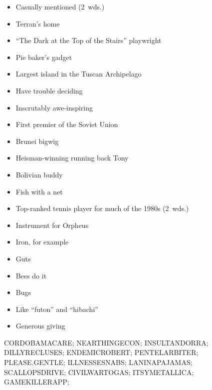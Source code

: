 {\begin{itemize}
        How infomercial often claim their products work (2~wds.)
      \item
        Casually mentioned (2~wds.)
    \end{itemize}
  \item
    \begin{itemize}
      \item
        Terran's home
      \item
        ``The Dark at the Top of the Stairs'' playwright
      \item
        Pie baker's gadget
      \item
        Largest island in the Tuscan Archipelago
      \item
        Have trouble deciding
      \item
        Inscrutably awe-inspiring
      \item
        First premier of the Soviet Union
    \end{itemize}
  \item
    \begin{itemize}
      \item
        Brunei bigwig
      \item
        Heisman-winning running back Tony
      \item
        Bolivian buddy
      \item
        Fish with a net
      \item
        Top-ranked tennis player for much of the 1980s (2~wds.)
    \end{itemize}
  \item
    \begin{itemize}
      \item
        Instrument for Orpheus
      \item
        Iron, for example
      \item
        Guts
      \item
        Bees do it
    \end{itemize}
  \item
    \begin{itemize}
      \item
        Bugs
      \item
        Like ``futon'' and ``hibachi''
    \end{itemize}
  \item
    \begin{itemize}
      \item
        Generous giving
    \end{itemize}
}{%
  \puzzlerow CORDOBAMACARE;
  \puzzlerow NEARTHINGECON;
  \puzzlerow INSULTANDORRA;
  \puzzlerow DILLYRECLUSES;
  \puzzlerow ENDEMICROBERT;
  \puzzlerow PENTELARBITER;
  \puzzlerow PLEASE.GENTLE;
  \puzzlerow ILLNESSESNABS;
  \puzzlerow LANINAPAJAMAS;
  \puzzlerow SCALLOPSDRIVE;
  \puzzlerow CIVILWARTOGAS;
  \puzzlerow ITSYMETALLICA;
  \puzzlerow GAMEKILLERAPP;
}

